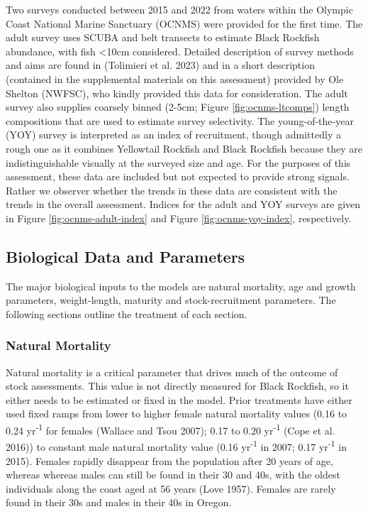 \documentclass[11pt,
  letterpaper,
]{article}
\begin{document}
Two surveys conducted between 2015 and 2022 from waters within the Olympic Coast National Marine Sanctuary (OCNMS) were provided for the first time. The adult survey uses SCUBA and belt transects to estimate Black Rockfish abundance, with fish \textless10cm considered. Detailed description of survey methods and aims are found in (Tolimieri et al. 2023) and in a short description (contained in the supplemental materials on this assessment) provided by Ole Shelton (NWFSC), who kindly provided this data for consideration. The adult survey also supplies coarsely binned (2-5cm; Figure \ref{fig:ocnms-ltcomps}) length compositions that are used to estimate survey selectivity. The young-of-the-year (YOY) survey is interpreted as an index of recruitment, though admittedly a rough one as it combines Yellowtail Rockfish and Black Rockfish because they are indistinguishable visually at the surveyed size and age. For the purposes of this assessment, these data are included but not expected to provide strong signals. Rather we observer whether the trends in these data are consistent with the trends in the overall assessment. Indices for the adult and YOY surveys are given in Figure \ref{fig:ocnms-adult-index} and Figure \ref{fig:ocnms-yoy-index}, respectively.

\hypertarget{biological-data-and-parameters}{%
\subsection{Biological Data and Parameters}\label{biological-data-and-parameters}}

The major biological inputs to the models are natural mortality, age and growth parameters, weight-length, maturity and stock-recruitment parameters. The following sections outline the treatment of each section.

\hypertarget{natural-mortality}{%
\subsubsection{Natural Mortality}\label{natural-mortality}}

Natural mortality is a critical parameter that drives much of the outcome of stock assessments. This value is not directly measured for Black Rockfish, so it either needs to be estimated or fixed in the model. Prior treatments have either used fixed ramps from lower to higher female natural mortality values (0.16 to 0.24 yr\textsuperscript{-1} for females (Wallace and Tsou 2007); 0.17 to 0.20 yr\textsuperscript{-1} (Cope et al. 2016)) to constant male natural mortality value (0.16 yr\textsuperscript{-1} in 2007; 0.17 yr\textsuperscript{-1} in 2015). Females rapidly disappear from the population after 20 years of age, whereas whereas males can still be found in their 30 and 40s, with the oldest individuals along the coast aged at 56 years (Love 1957). Females are rarely found in their 30s and males in their 40s in Oregon.
\end{document}
